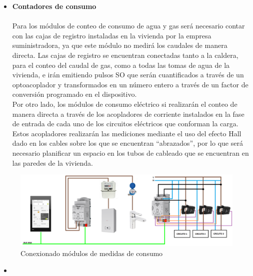 \begin{itemize}
\item \textbf{Contadores de consumo} \\ \\
Para los módulos de conteo de consumo de agua y gas será necesario contar con las cajas de registro instaladas en la vivienda por la empresa suministradora, ya que este módulo no medirá los caudales de manera directa. Las cajas de registro se encuentran conectadas tanto a la caldera, para el conteo del caudal de gas, como a todas las tomas de agua de la vivienda, e irán emitiendo pulsos SO que serán  cuantificados a través de un optoacoplador y transformados en un número entero a través de un factor de conversión programado en el dispositivo. \\
Por otro lado, los módulos de consumo eléctrico si realizarán el conteo de manera directa a través de los acopladores de corriente instalados en la fase de entrada de cada uno de los circuitos eléctricos que conforman la carga. Estos acopladores realizarán las mediciones mediante el uso del efecto Hall dado en los cables sobre los que se encuentran “abrazados”, por lo que será necesario planificar un espacio en los tubos de cableado que se encuentran en las paredes de la vivienda.
\end{itemize}
\begin{flushleft}
\begin{figure}[H]
\includegraphics[width=1.15\textwidth]{figures/conex_consumo.png}   
\caption{Conexionado módulos de medidas de consumo}
\label{fig:conex_consumo}
\end{figure}
\end{flushleft}

\begin{itemize}
\item \textbf{} \\ \\
\end{itemize} 
